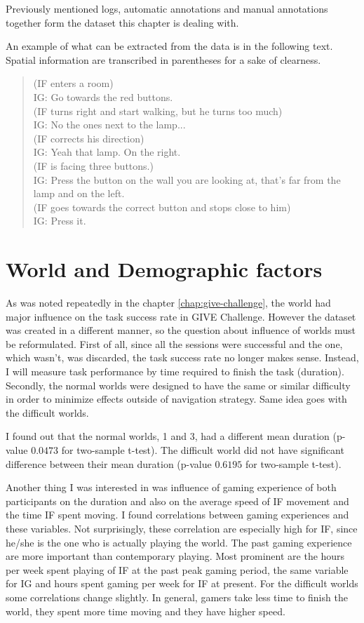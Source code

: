 Previously mentioned logs, automatic annotations and manual annotations together form the dataset this chapter is dealing with.

An example of what can be extracted from the data is in the following text. Spatial information are transcribed in parentheses for a sake of clearness.

\begin{verse}
(IF enters a room)\\
IG: Go towards the red buttons.\\
(IF turns right and start walking, but he turns too much)\\
IG: No the ones next to the lamp...\\
(IF corrects his direction)\\
IG: Yeah that lamp. On the right.\\
(IF is facing three buttons.)\\
IG: Press the button on the wall you are looking at, that's far from the lamp and on the left. \\
(IF goes towards the correct button and stops close to him)\\
IG: Press it.\\
\end{verse}

\section{World and Demographic factors}
As was noted repeatedly in the chapter \ref{chap:give-challenge}, the world had major influence on the task success rate in GIVE Challenge. However the dataset was created in a different manner, so the question about influence of worlds must be reformulated. First of all, since all the sessions were successful and the one, which wasn't, was discarded, the task success rate no longer makes sense. Instead, I will measure task performance by time required to finish the task (duration). Secondly, the normal worlds were designed to have the same or similar difficulty in order to minimize effects outside of navigation strategy. Same idea goes with the difficult worlds.

I found out that the normal worlds, 1 and 3, had a different mean duration (p-value $0.0473$ for two-sample t-test). The difficult world did not have significant difference between their mean duration (p-value $0.6195$ for two-sample t-test).

Another thing I was interested in was influence of gaming experience of both participants on the duration and also on the average speed of IF movement and the time IF spent moving. I found correlations between gaming experiences and these variables. Not surprisingly, these correlation are especially high for IF, since he/she is the one who is actually playing the world. The past gaming experience are more important than contemporary playing. Most prominent are the hours per week spent playing of IF at the past peak gaming period, the same variable for IG and hours spent gaming per week for IF at present. For the difficult worlds some correlations change slightly. In general, gamers take less time to finish the world, they spent more time moving and they have higher speed.


